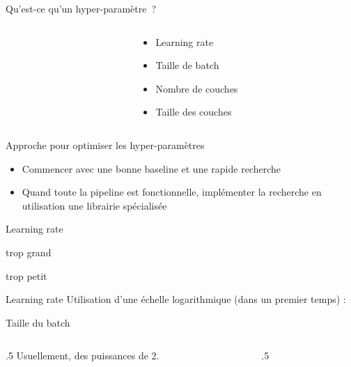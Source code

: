 \begin{frame}{Qu'est-ce qu'un hyper-paramètre~?}
  \begin{columns}
    \begin{column}[c]{0.5\textwidth}
    \end{column}
    \begin{column}[c]{0.5\textwidth}
      \begin{itemize}
        \item Learning rate
        \item Taille de batch
        \item Nombre de couches
        \item Taille des couches
      \end{itemize}
    \end{column}
  \end{columns}
\end{frame}

\begin{frame}{Approche pour optimiser les hyper-paramètres}
  \begin{itemize}
    \item Commencer avec une bonne baseline et une rapide recherche 
    \item Quand toute la pipeline est fonctionnelle, implémenter la recherche en utilisation une librairie spécialisée
  \end{itemize}
\end{frame}

\begin{frame}{Learning rate}
  \begin{minipage}{0.49\textwidth}
    \centering
    trop grand
  \end{minipage}\hfill
  \begin{minipage}{0.49\linewidth}
    \centering
    trop petit
  \end{minipage}\hfill

\end{frame}

\begin{frame}{Learning rate}
  Utilisation d'une échelle logarithmique (dans un premier temps) :
\end{frame}

\begin{frame}{Taille du batch}
  \begin{columns}
    \begin{column}{.5\tw}
      Usuellement, des puissances de 2.
    \end{column}
    \begin{column}{.5\tw}
    \end{column}
  \end{columns}
\end{frame}


